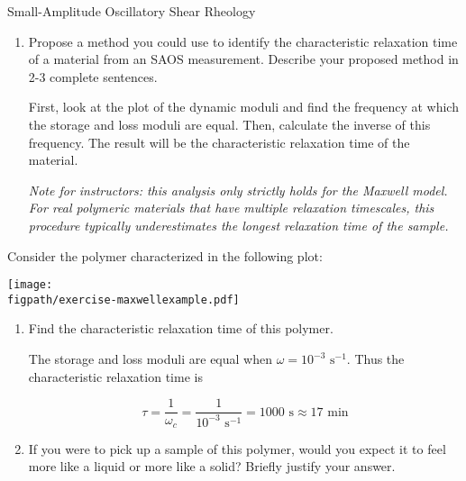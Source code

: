 \begin{activity}[extension]{Small-Amplitude Oscillatory Shear Rheology}
\begin{ctqs}
\begin{enumerate}
			\item Propose a method you could use to identify the characteristic relaxation time of a material from an SAOS measurement.  Describe your proposed method in 2-3 complete sentences.
			
				\begin{solution}[2.5in]{}
					First, look at the plot of the dynamic moduli and find the frequency at which the storage and loss moduli are equal.					
					Then, calculate the inverse of this frequency.  The result will be the characteristic relaxation time of the material.
					
					\emph{Note for instructors: this analysis only strictly holds for the Maxwell model.  For real polymeric materials that have multiple relaxation timescales, this procedure typically \emph{underestimates} the longest relaxation time of the sample.}
				\end{solution}
			
		\end{enumerate}
	
\end{ctqs}
	

\clearpage
\begin{exercises}

\exercise Consider the polymer characterized in the following plot:
				
		\centerline{\texttt{[image: \\figpath/exercise-maxwellexample.pdf]}}
		
		\begin{enumerate}
		
			\item Find the characteristic relaxation time of this polymer.
	
					\begin{solution}{}
					
						The storage and loss moduli are equal when $\omega=10^{-3}\text{ s}^{-1}$.  Thus the characteristic relaxation time is
						
						\begin{equation*}
							\tau = \frac{1}{\omega_c} = \frac{1}{10^{-3}\text{ s}^{-1}} = 1000\text{ s} \approx 17\text{ min}
						\end{equation*}
					\end{solution}
	
			\item If you were to pick up a sample of this polymer, would you expect it to feel more like a liquid or more like a solid?  Briefly justify your answer.
	

\end{enumerate}
\end{exercises}
\end{activity}
